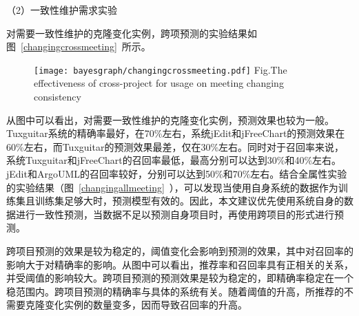 
（2）一致性维护需求实验

对需要一致性维护的克隆变化实例，跨项预测的实验结果如图~\ref{changingcrossmeeting}~所示。

\begin{figure}[h]
\centering
\texttt{[image: bayesgraph/changingcrossmeeting.pdf]}
{Fig.$\!$}{The effectiveness of cross-project for usage on meeting changing consistency}
\vspace{-1em}
\end{figure}

从图中可以看出，对需要一致性维护的克隆变化实例，预测效果也较为一般。Tuxguitar系统的精确率最好，在70\%左右，系统jEdit和jFreeChart的预测效果在60\%左右，而Tuxguitar的预测效果最差，仅在30\%左右。同时对于召回率来说，系统Tuxguitar和jFreeChart的召回率最低，最高分别可以达到30\%和40\%左右。jEdit和ArgoUML的召回率较好，分别可以达到50\%和70\%左右。结合全属性实验的实验结果（图~\ref{changingallmeeting}~），可以发现当使用自身系统的数据作为训练集且训练集足够大时，预测模型有效的。因此，本文建议优先使用系统自身的数据进行一致性预测，当数据不足以预测自身项目时，再使用跨项目的形式进行预测。

跨项目预测的效果是较为稳定的，阈值变化会影响到预测的效果，其中对召回率的影响大于对精确率的影响。从图中可以看出，推荐率和召回率具有正相关的关系，并受阈值的影响较大。跨项目预测的预测效果是较为稳定的，即精确率稳定在一个稳范围内。跨项目预测的精确率与具体的系统有关。随着阈值的升高，所推荐的不需要克隆变化实例的数量变多，因而导致召回率的升高。

